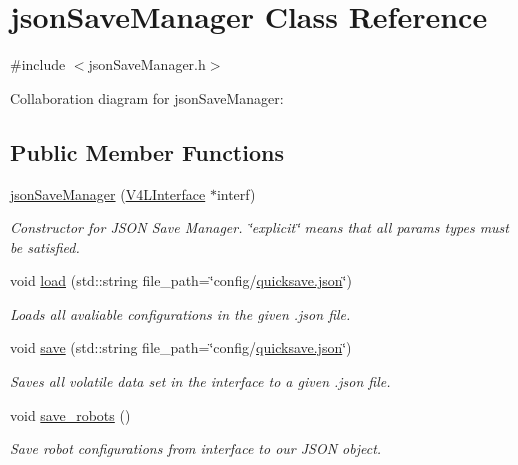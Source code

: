 \hypertarget{classjson_save_manager}{}\section{json\+Save\+Manager Class Reference}
\label{classjson_save_manager}


{\ttfamily \#include $<$json\+Save\+Manager.\+h$>$}



Collaboration diagram for json\+Save\+Manager\+:
\subsection*{Public Member Functions}
\begin{DoxyCompactItemize}
\item 
\hyperlink{classjson_save_manager_a1fdb652ff4085dbe3c563b47b850e68e}{json\+Save\+Manager} (\hyperlink{class_v_s_s_s___g_u_i_1_1_v4_l_interface}{V4\+L\+Interface} $\ast$interf)
\begin{DoxyCompactList}\small\item\em Constructor for J\+S\+ON Save Manager. \char`\"{}explicit\char`\"{} means that all params types must be satisfied. \end{DoxyCompactList}\item 
void \hyperlink{classjson_save_manager_a79fd35c53290662b58c5a4869376fa2e}{load} (std\+::string file\+\_\+path=\char`\"{}config/\hyperlink{json_save_manager_8h_ab701e3ac61a85b337ec5c1abaad6742d}{quicksave.\+json}\char`\"{})
\begin{DoxyCompactList}\small\item\em Loads all avaliable configurations in the given .json file. \end{DoxyCompactList}\item 
void \hyperlink{classjson_save_manager_a3e628f770c39e0111b46dac21d966171}{save} (std\+::string file\+\_\+path=\char`\"{}config/\hyperlink{json_save_manager_8h_ab701e3ac61a85b337ec5c1abaad6742d}{quicksave.\+json}\char`\"{})
\begin{DoxyCompactList}\small\item\em Saves all volatile data set in the interface to a given .json file. \end{DoxyCompactList}\item 
void \hyperlink{classjson_save_manager_ad5acf46f5a0620389055c16c3faa2519}{save\+\_\+robots} ()
\begin{DoxyCompactList}\small\item\em Save robot configurations from interface to our J\+S\+ON object. \end{DoxyCompactList}\item 

\end{DoxyCompactItemize}
